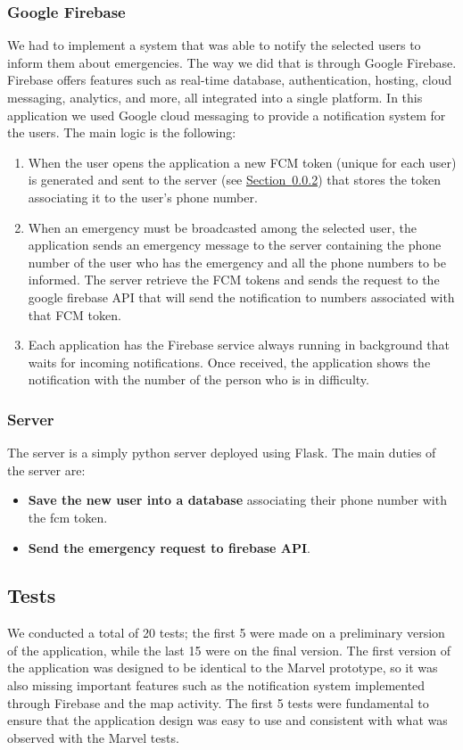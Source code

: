 \documentclass[12pt]{article}
\begin{document}
\subsubsection{Google Firebase}
\label{subsubsec:firebase}
We had to implement a system that was able to notify the selected 
users to inform them about emergencies. The way we did that is through 
Google Firebase. Firebase offers features such as real-time database, 
authentication, hosting, cloud messaging, analytics, and more, all 
integrated into a single platform. In this application we used Google 
cloud messaging to provide a notification system for the users. The main 
logic is the following:
\begin{enumerate}
    \item When the user opens the application a new FCM token (unique for 
    each user) is generated and sent to the server (see 
    \hyperref[subsubsec:server]{Section~\ref*{subsubsec:server}}) that stores 
    the token associating it to the user's phone number.
    \item When an emergency must be broadcasted among the selected user, 
    the application sends an emergency message to the server containing
    the phone number of the user who has the emergency and all the phone 
    numbers to be informed. The server retrieve the FCM tokens and 
    sends the request to the google firebase API that will send the 
    notification to numbers associated with that FCM token.
    \item Each application has the Firebase service always running 
    in background that waits for incoming notifications. Once received, 
    the application shows the notification with the number of the person 
    who is in difficulty. 
\end{enumerate}

\subsubsection{Server}
\label{subsubsec:server}
The server is a simply python server deployed using Flask. The main 
duties of the server are:
\begin{itemize}
    \item \textbf{Save the new user into a database} associating their  
    phone number with the fcm token.
    \item \textbf{Send the emergency request to firebase API}.
\end{itemize}

\subsection{Tests}
We conducted a total of 20 tests; the first 5 were made on a preliminary version of the application, while the last 15 were on the final version. The first version of the application was designed to be identical to the Marvel prototype, so it was also missing important features such as the notification system implemented through Firebase and the map activity. The first 5 tests were fundamental to ensure that the application design was easy to use and consistent with what was observed with the Marvel tests.
\end{document}
